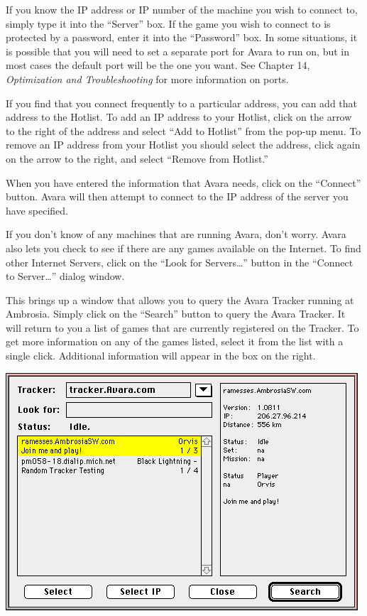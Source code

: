\documentclass{article}
\begin{document}
If you know the IP address or IP number of the machine you wish to connect to, simply type it into the ``Server'' box. If the game you wish to connect to is protected by a password, enter it into the ``Password'' box. In some situations, it is possible that you will need to set a separate port for Avara to run on, but in most cases the default port will be the one you want. See Chapter 14, \textit{Optimization and Troubleshooting} for more information on ports.

If you find that you connect frequently to a particular address, you can add that address to the Hotlist. To add an IP address to your Hotlist, click on the arrow to the right of the address and select ``Add to Hotlist'' from the pop-up menu. To remove an IP address from your Hotlist you should select the address, click again on the arrow to the right, and select ``Remove from Hotlist.''

When you have entered the information that Avara needs, click on the ``Connect'' button. Avara will then attempt to connect to the IP address of the server you have specified.

If you don't know of any machines that are running Avara, don't worry. Avara also lets you check to see if there are any games available on the Internet. To find other Internet Servers, click on the ``Look for Servers\dots'' button in the ``Connect to Server\dots'' dialog window.

This brings up a window that allows you to query the Avara Tracker running at Ambrosia. Simply click on the ``Search'' button to query the Avara Tracker. It will return to you a list of games that are currently registered on the Tracker. To get more information on any of the games listed, select it from the list with a single click. Additional information will appear in the box on the right.

\begin{center}
	\includegraphics[width=\textwidth]{img/22.png}
\end{center}
\end{document}
